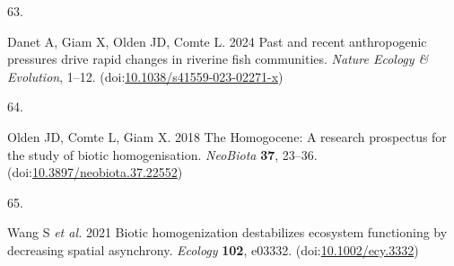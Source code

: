 \documentclass[
]{article}
\newlength{\cslhangindent}
\newlength{\csllabelwidth}
\newlength{\cslentryspacingunit} %
\newenvironment{CSLReferences}[2] %
 {%
  \setlength{\parindent}{0pt}
  \ifodd #1
  \let\oldpar\par
  \def\par{\hangindent=\cslhangindent\oldpar}
  \fi
  \setlength{\parskip}{#2\cslentryspacingunit}
 }%
 {}
\newcommand{\CSLLeftMargin}[1]{\parbox[t]{\csllabelwidth}{#1}}
\newcommand{\CSLRightInline}[1]{\parbox[t]{\linewidth - \csllabelwidth}{#1}\break}
\begin{document}
\begin{CSLReferences}{0}{0}
\leavevmode{}%
\CSLLeftMargin{63. }%
\CSLRightInline{Danet A, Giam X, Olden JD, Comte L. 2024 Past and recent anthropogenic pressures drive rapid changes in riverine fish communities. \emph{Nature Ecology \& Evolution}, 1--12. (doi:\href{https://doi.org/10.1038/s41559-023-02271-x}{10.1038/s41559-023-02271-x})}

\leavevmode{}%
\CSLLeftMargin{64. }%
\CSLRightInline{Olden JD, Comte L, Giam X. 2018 The {Homogocene}: A research prospectus for the study of biotic homogenisation. \emph{NeoBiota} \textbf{37}, 23--36. (doi:\href{https://doi.org/10.3897/neobiota.37.22552}{10.3897/neobiota.37.22552})}

\leavevmode{}%
\CSLLeftMargin{65. }%
\CSLRightInline{Wang S \emph{et al.} 2021 Biotic homogenization destabilizes ecosystem functioning by decreasing spatial asynchrony. \emph{Ecology} \textbf{102}, e03332. (doi:\href{https://doi.org/10.1002/ecy.3332}{10.1002/ecy.3332})}

\end{CSLReferences}
\end{document}
